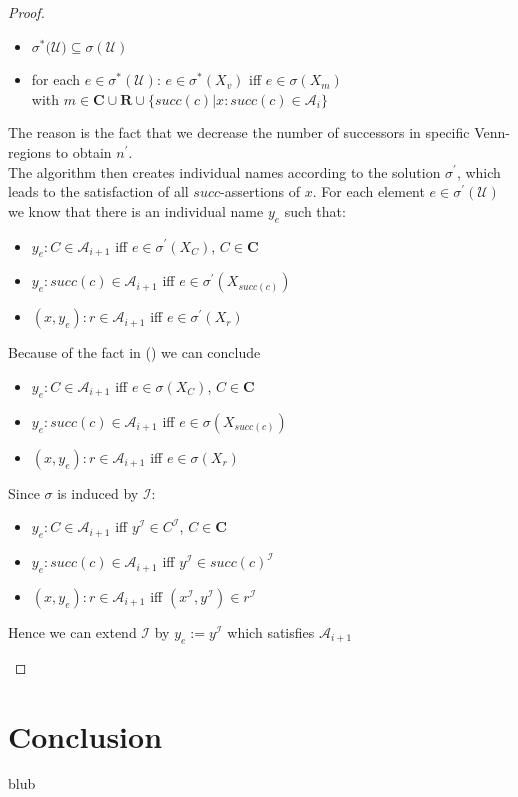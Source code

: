 \documentclass{book}
\theoremstyle{break}
\theoremstyle{definition}
\begin{document}
\begin{proof}
\begin{itemize}
\begin{itemize}
\item $\sigma^\ast(\mathcal{U)}\subseteq\sigma(\mathcal{U})$
\item for each $e\in \sigma^\ast(\mathcal{U})$: $e\in \sigma^\ast(X_v)$ iff $e\in\sigma(X_m)$\\
with $m\in\mathbf{C}\cup\mathbf{R}\cup\{succ(c)|x:succ(c)\in \mathcal{A}_i\}$
\end{itemize}
The reason is the fact that we decrease the number of successors in specific Venn-regions to obtain $n^\prime$.\\
The algorithm then creates individual names according to the solution $\sigma^\prime$, which leads to the satisfaction of all $succ$-assertions of $x$. For each element $e\in\sigma^\prime(\mathcal{U})$ we know that there is an individual name $y_e$ such that:
\begin{itemize}
\item $y_e:C\in\mathcal{A}_{i+1}$ iff $e\in\sigma^\prime(X_C)$, $C\in\mathbf{C}$
\item $y_e:succ(c)\in\mathcal{A}_{i+1}$ iff $e\in\sigma^\prime(X_{succ(c)})$
\item $(x,y_e):r\in\mathcal{A}_{i+1}$ iff $e\in\sigma^\prime(X_r)$
\end{itemize}
Because of the fact in (\dag) we can conclude
\begin{itemize}
\item $y_e:C\in\mathcal{A}_{i+1}$ iff $e\in\sigma(X_C)$, $C\in\mathbf{C}$
\item $y_e:succ(c)\in\mathcal{A}_{i+1}$ iff $e\in\sigma(X_{succ(c)})$
\item $(x,y_e):r\in\mathcal{A}_{i+1}$ iff $e\in\sigma(X_r)$
\end{itemize}
Since $\sigma$ is induced by $\mathcal{I}$:
\begin{itemize}
\item $y_e:C\in\mathcal{A}_{i+1}$ iff $y^\mathcal{I}\in C^\mathcal{I}$, $C\in\mathbf{C}$
\item $y_e:succ(c)\in\mathcal{A}_{i+1}$ iff $y^\mathcal{I}\in succ(c)^\mathcal{I}$
\item $(x,y_e):r\in\mathcal{A}_{i+1}$ iff $(x^\mathcal{I},y^\mathcal{I})\in r^\mathcal{I}$
\end{itemize}
Hence we can extend $\mathcal{I}$ by $y_e:=y^\mathcal{I}$ which satisfies $\mathcal{A}_{i+1}$
\end{itemize}
\end{proof}
\chapter{Conclusion}
blub
\normalem


\end{document}
